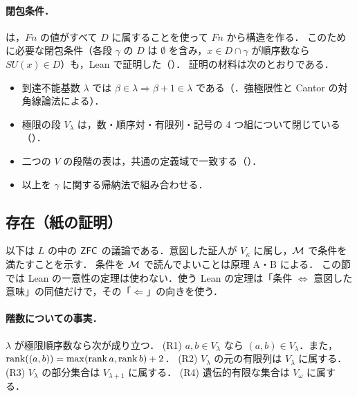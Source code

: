 \paragraph{閉包条件．} は，$Fn$ の値がすべて $D$ に属することを使って $Fn$ から構造を作る．
このために必要な閉包条件（各段 $\gamma$ の $D$ は $\emptyset$ を含み，$x\in D\cap\gamma$ が順序数なら $SU(x)\in D$）も，Lean で証明した（）．
証明の材料は次のとおりである．
\begin{itemize}
\item 到達不能基数 $\lambda$ では $\beta\in\lambda\Rightarrow\beta+1\in\lambda$ である（．強極限性と Cantor の対角線論法による）．
\item 極限の段 $V_\lambda$ は，数・順序対・有限列・記号の 4 つ組について閉じている（）．
\item 二つの $V$ の段階の表は，共通の定義域で一致する（）．
\item 以上を $\gamma$ に関する帰納法で組み合わせる．
\end{itemize}

\subsection{存在（紙の証明）}\label{sec:exist}
以下は $L$ の中の $\mathsf{ZFC}$ の議論である．意図した証人が $V_\kappa$ に属し，$\mathcal{M}$ で条件を満たすことを示す．
条件を $\mathcal{M}$ で読んでよいことは原理 A・B による．
この節では Lean の一意性の定理は使わない．使う Lean の定理は「条件 $\Leftrightarrow$ 意図した意味」の同値だけで，その「$\Leftarrow$」の向きを使う．

\paragraph{階数についての事実．}$\lambda$ が極限順序数なら次が成り立つ．
(R1) $a,b\in V_\lambda$ なら $(a,b)\in V_\lambda$．また，$\operatorname{rank}((a,b))=\max(\operatorname{rank} a,\operatorname{rank} b)+2$．
(R2) $V_\lambda$ の元の有限列は $V_\lambda$ に属する．
(R3) $V_\lambda$ の部分集合は $V_{\lambda+1}$ に属する．
(R4) 遺伝的有限な集合は $V_\omega$ に属する．

